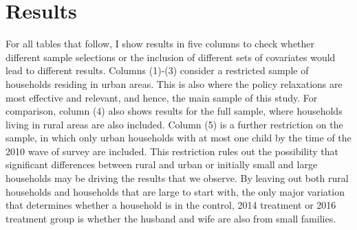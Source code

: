 \documentclass[12pt]{extarticle}
\begin{document}
\section{Results}
For all tables that follow, I show results in five columns to check whether different sample selections or the inclusion of different sets of covariates would lead to different results. Columns (1)-(3) consider a restricted sample of households residing in urban areas. This is also where the policy relaxations are most effective and relevant, and hence, the main sample of this study. For comparison, column (4) also shows results for the full sample, where households living in rural areas are also included. Column (5) is a further restriction on the sample, in which only urban households with at most one child by the time of the 2010 wave of survey are included. This restriction rules out the possibility that significant differences between rural and urban or initially small and large households may be driving the results that we observe. By leaving out both rural households and households that are large to start with, the only major variation that determines whether a household is in the control, 2014 treatment or 2016 treatment group is whether the husband and wife are also from small families.
\end{document}
